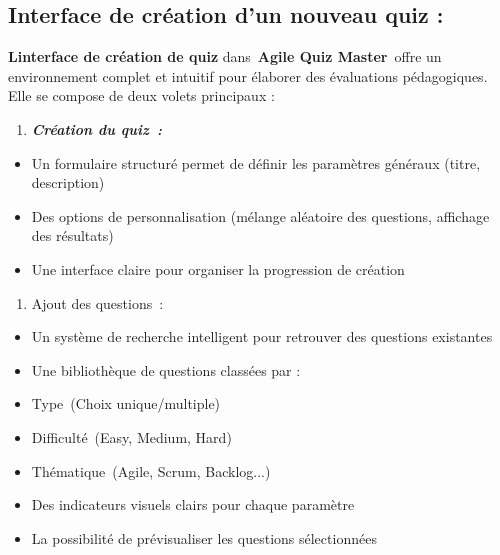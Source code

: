 \documentclass[12pt,a4paper,twoside]{report}
\begin{document}
\hypertarget{interface-de-cruxe9ation-dun-nouveau-quiz}{%
\subsection{Interface de création d'un nouveau quiz
:}\label{interface-de-cruxe9ation-dun-nouveau-quiz}}

\textbf{L\textquotesingle interface de création de quiz}
dans~\textbf{Agile Quiz Master}~offre un environnement complet et
intuitif pour élaborer des évaluations pédagogiques. Elle se compose de
deux volets principaux :

\begin{enumerate}
\def\labelenumi{\arabic{enumi}.}
\item
  \emph{\textbf{Création du quiz~:}}
\end{enumerate}

\begin{itemize}
\item
  Un formulaire structuré permet de définir les paramètres généraux
  (titre, description)
\item
  Des options de personnalisation (mélange aléatoire des questions,
  affichage des résultats)
\item
  Une interface claire pour organiser la progression de création
\end{itemize}

\begin{enumerate}
\def\labelenumi{\arabic{enumi}.}
\setcounter{enumi}{1}
\item
  Ajout des questions~:
\end{enumerate}

\begin{itemize}
\item
  Un système de recherche intelligent pour retrouver des questions
  existantes
\item
  Une bibliothèque de questions classées par :
\end{itemize}

\begin{itemize}
\item
  Type~(Choix unique/multiple)
\item
  Difficulté~(Easy, Medium, Hard)
\item
  Thématique~(Agile, Scrum, Backlog...)
\end{itemize}

\begin{itemize}
\item
  Des indicateurs visuels clairs pour chaque paramètre
\item
  La possibilité de prévisualiser les questions sélectionnées
\end{itemize}
\end{document}
